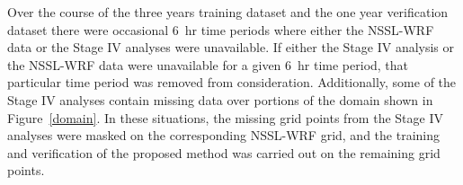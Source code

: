 Over the course of the three years training dataset and the one year verification dataset there were occasional \mbox{6 hr} time periods where either the NSSL-WRF data or the Stage IV analyses were unavailable.
If either the Stage IV analysis or the NSSL-WRF data were unavailable for a given \mbox{6 hr} time period, that particular time period was removed from consideration.
Additionally, some of the Stage IV analyses contain missing data over portions of the domain shown in \mbox{Figure \ref{domain}}.
In these situations, the missing grid points from the Stage IV analyses were masked on the corresponding NSSL-WRF grid, and the training and verification of the proposed method was carried out on the remaining grid points.

